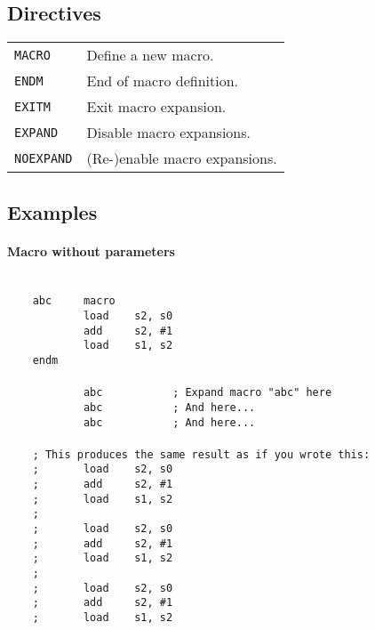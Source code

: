     \subsection{Directives}
        \begin{table}[h!]
            \begin{tabular}{ll}
                \texttt{MACRO}      & Define a new macro. \\
                \texttt{ENDM}       & End of macro definition. \\
                \texttt{EXITM}      & Exit macro expansion. \\
                \texttt{EXPAND}     & Disable macro expansions.\\
                \texttt{NOEXPAND}   & (Re-)enable macro expansions.\\
            \end{tabular}
        \end{table}

    \subsection{Examples}
        \paragraph{Macro without parameters}
        ~\\
        \verb'    abc     macro'\\
        \verb'            load    s2, s0'\\
        \verb'            add     s2, #1'\\
        \verb'            load    s1, s2'\\
        \verb'    endm'\\
        \verb''\\
        \verb'            abc           ; Expand macro "abc" here'\\
        \verb'            abc           ; And here...'\\
        \verb'            abc           ; And here...'\\
        \verb''\\
        \verb'    ; This produces the same result as if you wrote this:'\\
        \verb'    ;       load    s2, s0'\\
        \verb'    ;       add     s2, #1'\\
        \verb'    ;       load    s1, s2'\\
        \verb'    ;'\\
        \verb'    ;       load    s2, s0'\\
        \verb'    ;       add     s2, #1'\\
        \verb'    ;       load    s1, s2'\\
        \verb'    ;'\\
        \verb'    ;       load    s2, s0'\\
        \verb'    ;       add     s2, #1'\\
        \verb'    ;       load    s1, s2'\\

